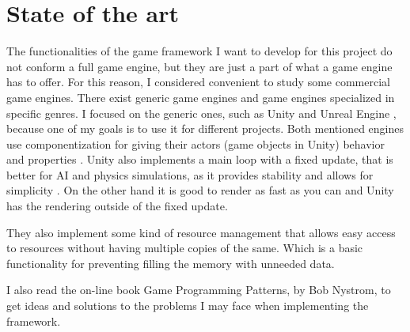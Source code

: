 \chapter{State of the art}\label{ch:state_of_the_art}

The functionalities of the game framework I want to develop for this project do not 
conform a full game engine, but they are just a part of what a game engine has to 
offer. For this reason, I considered convenient to study some commercial game engines. 
There exist generic game engines and game engines specialized in specific genres. 
I focused on the generic ones, such as Unity\cite{unity3d} and Unreal Engine
\cite{unrealengine}, because one of my goals is to use it for different projects. 
Both mentioned engines use componentization for giving their actors (game objects 
in Unity) behavior and properties \cite{uecomponents}\cite{unitycomponents}. Unity 
also implements a main loop with a fixed update\cite{unitymainloop}, that is better 
for AI and physics simulations, as it provides stability and allows for simplicity
\cite{gameloop}. On the other hand it is good to render as fast as you can and 
Unity has the rendering outside of the fixed update.

They also implement some kind of resource management that allows easy access to resources 
without having multiple copies of the same. Which is a basic functionality 
for preventing filling the memory with unneeded data.

I also read the on-line book Game Programming Patterns\cite{gameprogrammingpatterns}, 
by Bob Nystrom, to get ideas and solutions to the problems I may face when implementing 
the framework.
